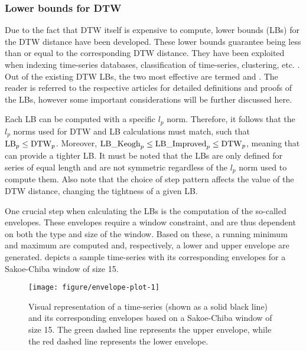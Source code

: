 \subsubsection{Lower bounds for DTW}
\label{sec:lbs}

Due to the fact that DTW itself is expensive to compute,
lower bounds (LBs) for the DTW distance have been developed.
These lower bounds guarantee being less than or equal to the corresponding DTW distance.
They have been exploited when indexing time-series databases,
classification of time-series,
clustering,
etc. \citep{keogh2005, begum2015}.
Out of the existing DTW LBs,
the two most effective are termed  \citep{keogh2005} and  \citep{lemire2009}.
The reader is referred to the respective articles for detailed definitions and proofs of the LBs,
however some important considerations will be further discussed here.

Each LB can be computed with a specific $l_p$ norm.
Therefore, it follows that the $l_p$ norms used for DTW and LB calculations must match,
such that $\text{LB}_p \leq \text{DTW}_p{}$.
Moreover, $\text{LB\_Keogh}_p \leq \text{LB\_Improved}_p \leq \text{DTW}_p{}$,
meaning that  can provide a tighter LB.
It must be noted that the LBs are only defined for series of equal length and are not symmetric regardless of the $l_p$ norm used to compute them.
Also note that the choice of step pattern affects the value of the DTW distance,
changing the tightness of a given LB.

One crucial step when calculating the LBs is the computation of the so-called envelopes.
These envelopes require a window constraint,
and are thus dependent on both the type and size of the window.
Based on these, a running minimum and maximum are computed and, respectively, a lower and upper envelope are generated.
 depicts a sample time-series with its corresponding envelopes for a Sakoe-Chiba window of size 15.

\begin{figure}[htbp]

{\centering \texttt{[image: figure/envelope-plot-1]}

}

\caption{Visual representation of a time-series (shown as a solid black line) and its corresponding envelopes based on a Sakoe-Chiba window of size 15. The green dashed line represents the upper envelope, while the red dashed line represents the lower envelope.}\label{fig:envelope-plot}
\end{figure}

